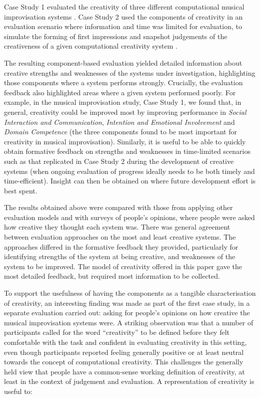 \documentclass[10pt,letterpaper]{article}
\begin{document}
Case Study 1 \cite{jordanousphd,jordanous12cc} evaluated the creativity of three different computational musical improvisation systems \cite{jordanous12cc}. 
Case Study 2 used the components of creativity in an evaluation scenario where information and time was limited for evaluation, to simulate the forming of first impressions and snapshot judgements of the creativeness of a given computational creativity system \cite{jordanousphd,jordanous16aisb}. 

The resulting component-based evaluation yielded detailed information about creative strengths and weaknesses of the systems under investigation, highlighting those components where a system performs strongly. Crucially, the evaluation feedback also highlighted areas where a given system performed poorly. For example, in the musical improvisation study, Case Study 1, we found that, in general, creativity could be improved most by improving performance in {\em Social Interaction and Communication}, {\em Intention and Emotional Involvement} and {\em Domain Competence} (the three components found to be most important for creativity in musical improvisation). Similarly, it is useful to be able to quickly obtain formative feedback on strengths and weaknesses in time-limited scenarios such as that replicated in Case Study 2 during the development of creative systems (when ongoing evaluation of progress ideally needs to be both timely and time-efficient). Insight can then be obtained on where future development effort is best spent. 

The results obtained above were compared with those from applying other evaluation models and with surveys of people's opinions, where people were asked how creative they thought each system was. There was general agreement between evaluation approaches on the most and least creative systems. The approaches differed in the formative feedback they provided, particularly for identifying strengths of the system at being creative, and weaknesses of the system to be improved. The model of creativity offered in this paper gave the most detailed feedback, but required most information to be collected. 

To support the usefulness of having the components as a tangible characterisation of creativity, an interesting finding was made as part of the first case study, in a separate evaluation carried out: asking for people's opinions on how creative the musical improvisation systems were. A striking observation was that a number of participants called for the word ``creativity'' to be defined before they felt comfortable with the task and confident in evaluating creativity in this setting, even though participants reported feeling generally positive or at least neutral towards the concept of computational creativity. This challenges the generally held view that people have a  common-sense working definition of creativity, at least in the context of judgement and evaluation. A representation of creativity is useful to:
\end{document}

